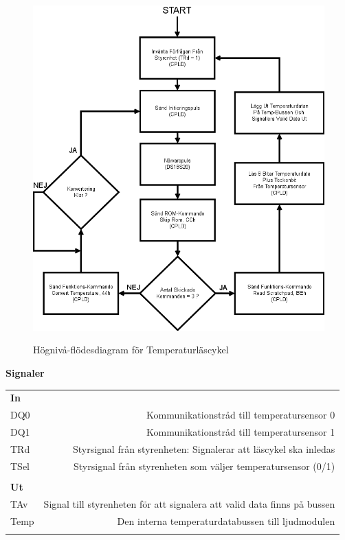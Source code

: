 \documentclass[a4paper,11pt]{article}
\begin{document}
	\begin{figure}[ht!tb]
	  \centering
	      \includegraphics[scale=0.5, angle=0]{ReadCycleFlowChart.png}
		\label{fig:RCFlowChart}
	  	\caption{Högnivå-flödesdiagram för Temperaturläscykel}
	\end{figure}

{\noindent \bf Signaler}

	\begin{tabular}{l r}
		\\{\bf In} &  \\
		DQ0 & Kommunikationstråd till temperatursensor 0\\
		DQ1 & Kommunikationstråd till temperatursensor 1\\
		TRd & Styrsignal från styrenheten: Signalerar att läscykel ska inledas\\
		TSel & Styrsignal från styrenheten som väljer temperatursensor (0/1)\\\\
		{\bf Ut} &  \\
		TAv & Signal till styrenheten för att signalera att valid data finns på bussen\\
		Temp & Den interna temperaturdatabussen till ljudmodulen\\\\
	\end{tabular}
\end{document}
